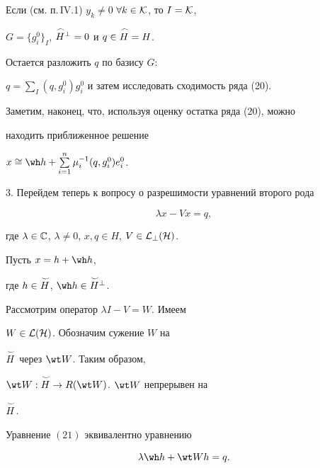  


Если (см. п.\,IV.1) $y_k\ne0$ $\forall k\in\cal K$, то $I=\cal K$, 


$G=\{g^0_i\}_I$, $\overset{\,\frown}{H}{}^\bot=0$ и $q\in\overset{\,\frown}{H}{}=H$. 


Остается разложить $q$ по базису $G$: 


$q=\sum\limits_I(q,g^0_i)g^0_i$ и затем исследовать сходимость ряда (20). 


 


Заметим, наконец, что, используя оценку остатка ряда (20), можно 


находить приближенное решение 


$x\cong\wh h+\sum\limits^n_{i=1}\mu^{-1}_i(q,g^0_i)e^0_i$. 


\smallskip 


 


3. Перейдем теперь к вопросу о разрешимости уравнений второго рода 


\begin{equation} 


\lambda x-V x=q, 


\end{equation} 


где $\lambda\in\Bbb C$, $\lambda\ne0$, $x,q\in H$, $V\in\cal L_\bot(H)$. 


Пусть $x=h+\wh h$, 


где $h\in\overset{\,\smile}{H}{}$, $\wh h\in\up{\smile}{H}^\bot$. 


Рассмотрим оператор $\lambda I-V=W$. Имеем 


$W\in\cal L(H)$. Обозначим сужение $W$ на 


$\overset{\,\smile}{H}{}$ через $\wt W$. Таким образом, 


$\wt W:\up{\smile}{H}\to R(\wt W)$.\; $\wt W$ непрерывен на 


$\overset{\,\smile}{H}{}$. 


 


\begin{lem} 


Уравнение $(21)$ эквивалентно уравнению 


\begin{equation} 


\lambda\wh h+\wt W h=q. 


\end{equation} 


\end{lem} 


